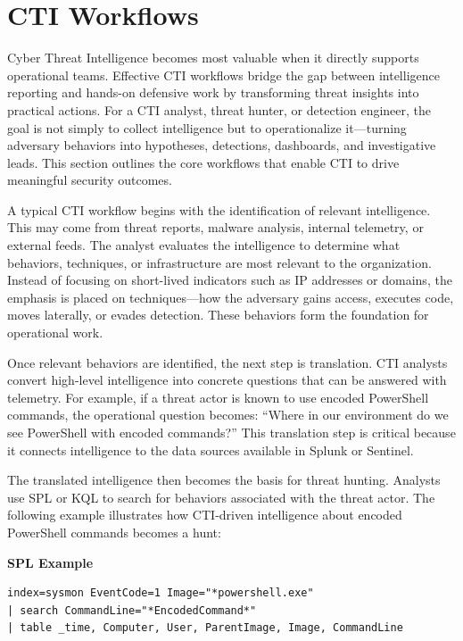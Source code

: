 \section{CTI Workflows}

Cyber Threat Intelligence becomes most valuable when it directly supports operational teams. Effective CTI workflows bridge 
the gap between intelligence reporting and hands-on defensive work by transforming threat insights into practical actions. 
For a CTI analyst, threat hunter, or detection engineer, the goal is not simply to collect intelligence but to operationalize 
it—turning adversary behaviors into hypotheses, detections, dashboards, and investigative leads. This section outlines 
the core workflows that enable CTI to drive meaningful security outcomes.

A typical CTI workflow begins with the identification of relevant intelligence. This may come from threat reports, malware analysis, 
internal telemetry, or external feeds. The analyst evaluates the intelligence to determine what behaviors, techniques, or 
infrastructure are most relevant to the organization. Instead of focusing on short-lived indicators such as IP addresses or 
domains, the emphasis is placed on techniques—how the adversary gains access, executes code, moves laterally, or evades detection. 
These behaviors form the foundation for operational work.

Once relevant behaviors are identified, the next step is translation. CTI analysts convert high-level intelligence into concrete 
questions that can be answered with telemetry. For example, if a threat actor is known to use encoded PowerShell commands, 
the operational question becomes: “Where in our environment do we see PowerShell with encoded commands?” This translation step 
is critical because it connects intelligence to the data sources available in Splunk or Sentinel.

The translated intelligence then becomes the basis for threat hunting. Analysts use SPL or KQL to search for behaviors associated 
with the threat actor. The following example illustrates how CTI-driven intelligence about encoded PowerShell commands becomes a hunt:

\textbf{SPL Example}
\begin{lstlisting}
index=sysmon EventCode=1 Image="*powershell.exe"
| search CommandLine="*EncodedCommand*"
| table _time, Computer, User, ParentImage, Image, CommandLine
\end{lstlisting}

